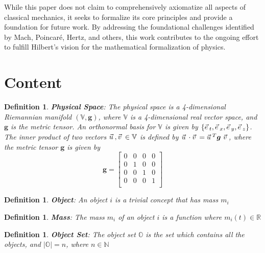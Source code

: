 \documentclass[12pt]{amsart}
\newtheorem{definition}[theorem]{Definition}
\let\oldvec\vec
\renewcommand{\vec}[1]{\oldvec{#1}\hspace{0.1em}}
\begin{document}
While this paper does not claim to comprehensively axiomatize all aspects of classical mechanics, it seeks to formalize its core principles and provide a foundation for future work. By addressing the foundational challenges identified by Mach, Poincaré, Hertz, and others, this work contributes to the ongoing effort to fulfill Hilbert's vision for the mathematical formalization of physics.




\newpage

\section{Content}

\begin{definition}
    \textbf{Physical Space}: The physical space is a 4-dimensional Riemannian manifold $ (\mathbb{V}, \boldsymbol{g}) $, where $ \mathbb{V} $ is a 4-dimensional real vector space, and $ \boldsymbol{g} $ is the metric tensor. An orthonormal basis for $ \mathbb{V} $ is given by $\{\vec{e}_t, \vec{e}_x, \vec{e}_y, \vec{e}_z\}$. The inner product of two vectors $ \vec{u}, \vec{v} \in \mathbb{V} $ is defined by $ \vec{u} \cdot \vec{v} = \vec{u}^{T} \boldsymbol{g}\ \vec{v} $, where the metric tensor $ \boldsymbol{g} $ is given by
$$
\boldsymbol{g} = \begin{bmatrix}
0 & 0 & 0 & 0 \\
0 & 1 & 0 & 0 \\
0 & 0 & 1 & 0 \\
0 & 0 & 0 & 1 \\
\end{bmatrix}
$$

\end{definition}

\begin{definition}
\textbf{Object}: An object $i$ is a trivial concept that has mass $m_i$
\end{definition}

\begin{definition}
\textbf{Mass}: The mass $m_i$ of an object $i$ is a function where $m_i (t) \in \mathbb{R}$
\end{definition}

\begin{definition}
\textbf{Object Set}: The object set $\mathbb{O}$ is the set which contains all the objects, and $\left | \mathbb{O} \right | = n$, where $n \in \mathbb{N}$
\end{definition}
\end{document}

